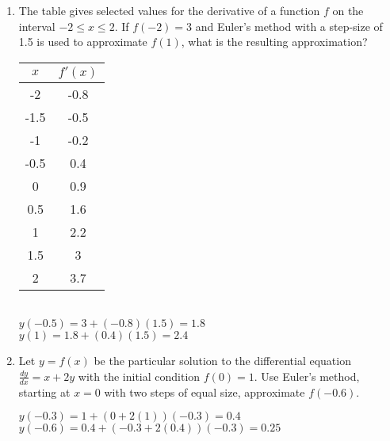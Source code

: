 \documentclass[10pt,letterpaper]{report}
\begin{document}
\begin{enumerate}
  \item{The table gives selected values for the derivative of a function $f$ on the interval $-2\leq x\leq 2$. If $f(-2)=3$ and Euler's method with a step-size of 1.5 is used to approximate $f(1)$, what is the resulting approximation? \\}
  \begin{multicols}{2}
      \begin{center}
    \begin{tabular}{| c | c |}
      \hline
      $x$ & $f'(x)$ \\
      \hline
      -2 & -0.8 \\
      \hline
      -1.5 & -0.5 \\
      \hline
      -1 & -0.2 \\
      \hline
      -0.5 & 0.4 \\
      \hline
      0 & 0.9 \\
      \hline
      0.5 & 1.6 \\
      \hline
      1 & 2.2 \\
      \hline
      1.5 & 3 \\
      \hline
      2 & 3.7 \\
      \hline
    \end{tabular}
  \end{center} \\
  
  $y(-0.5)=3+(-0.8)(1.5)=1.8$ \\
  
  $y(1)=1.8+(0.4)(1.5)=2.4$ \\
  \end{multicols}
  
  \hline
  
  \item{Let $y=f(x)$ be the particular solution to the differential equation $\frac{dy}{dx}=x+2y$ with the initial condition $f(0)=1$. Use Euler's method, starting at $x=0$ with two steps of equal size, approximate $f(-0.6)$. \\}
  
    $y(-0.3)=1+(0+2(1))(-0.3)=0.4$ \\
    
    $y(-0.6)=0.4+(-0.3+2(0.4))(-0.3)=0.25$ \\
    
    \pagebreak
    

\end{enumerate}
\end{document}
